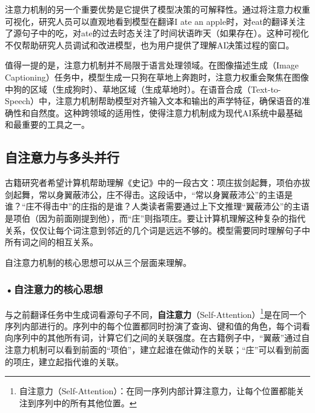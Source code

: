 注意力机制的另一个重要优势是它提供了模型决策的可解释性。通过将注意力权重可视化，研究人员可以直观地看到模型在翻译I ate an apple时，对eat的翻译关注了源句子中的吃，对ate的过去时态关注了时间状语昨天（如果存在）。这种可视化不仅帮助研究人员调试和改进模型，也为用户提供了理解AI决策过程的窗口。

值得一提的是，注意力机制并不局限于语言处理领域。在图像描述生成（Image Captioning）任务中，模型生成一只狗在草地上奔跑时，注意力权重会聚焦在图像中狗的区域（生成狗时）、草地区域（生成草地时）。在语音合成（Text-to-Speech）中，注意力机制帮助模型对齐输入文本和输出的声学特征，确保语音的准确性和自然度。这种跨领域的适用性，使得注意力机制成为现代AI系统中最基础和最重要的工具之一。





\subsection{自注意力与多头并行}
古籍研究者希望计算机帮助理解《史记》中的一段古文：项庄拔剑起舞，项伯亦拔剑起舞，常以身翼蔽沛公，庄不得击。这段话中，“常以身翼蔽沛公”的主语是谁？“庄不得击中”的庄指的是谁？人类读者需要通过上下文推理“翼蔽沛公”的主语是项伯（因为前面刚提到他），而“庄”则指项庄。要让计算机理解这种复杂的指代关系，仅仅让每个词注意到邻近的几个词是远远不够的。模型需要同时理解句子中所有词之间的相互关系。



自注意力机制的核心思想可以从三个层面来理解。

\subsubsection*{\textbf{•自注意力的核心思想}}

与之前翻译任务中生成词看源句子不同，\textbf{自注意力}（Self-Attention）\footnote{自注意力（Self-Attention）：在同一序列内部计算注意力，让每个位置都能关注到序列中的所有其他位置。}是在同一个序列内部进行的。序列中的每个位置都同时扮演了查询、键和值的角色，每个词看向序列中的其他所有词，计算它们之间的关联强度。在古籍例子中，“翼蔽”通过自注意力机制可以看到前面的“项伯”，建立起谁在做动作的关联；“庄”可以看到前面的项庄，建立起指代谁的关联。

